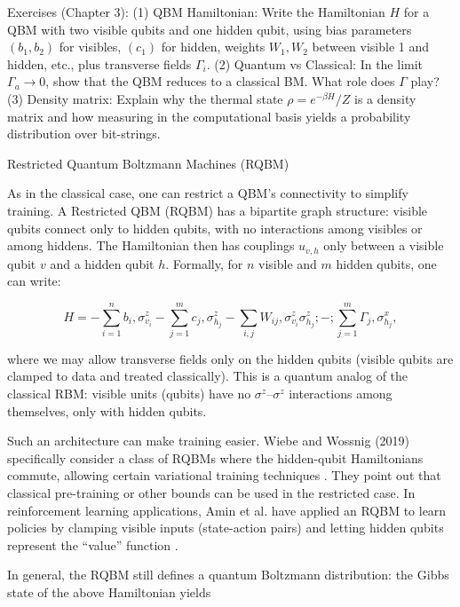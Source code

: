 Exercises (Chapter 3): (1) QBM Hamiltonian: Write the Hamiltonian $H$ for a QBM with two visible qubits and one hidden qubit, using bias parameters $(b_1,b_2)$ for visibles, $(c_1)$ for hidden, weights $W_{1},W_{2}$ between visible 1 and hidden, etc., plus transverse fields $\Gamma_i$. (2) Quantum vs Classical: In the limit $\Gamma_a\to 0$, show that the QBM reduces to a classical BM. What role does $\Gamma$ play? (3) Density matrix: Explain why the thermal state $\rho=e^{-\beta H}/Z$ is a density matrix and how measuring in the computational basis yields a probability distribution over bit-strings.





Restricted Quantum Boltzmann Machines (RQBM)





As in the classical case, one can restrict a QBM’s connectivity to simplify training. A Restricted QBM (RQBM) has a bipartite graph structure: visible qubits connect only to hidden qubits, with no interactions among visibles or among hiddens.  The Hamiltonian then has couplings $u_{v,h}$ only between a visible qubit $v$ and a hidden qubit $h$.  Formally, for $n$ visible and $m$ hidden qubits, one can write:

$$

H = -\sum_{i=1}^n b_i,\sigma^z_{v_i} - \sum_{j=1}^m c_j,\sigma^z_{h_j} - \sum_{i,j} W_{ij},\sigma^z_{v_i}\sigma^z_{h_j} ;-; \sum_{j=1}^m \Gamma_j,\sigma^x_{h_j},

$$

where we may allow transverse fields only on the hidden qubits (visible qubits are clamped to data and treated classically). This is a quantum analog of the classical RBM: visible units (qubits) have no $\sigma^z$–$\sigma^z$ interactions among themselves, only with hidden qubits.



Such an architecture can make training easier.  Wiebe and Wossnig (2019) specifically consider a class of RQBMs where the hidden-qubit Hamiltonians commute, allowing certain variational training techniques . They point out that classical pre-training or other bounds can be used in the restricted case.  In reinforcement learning applications, Amin et al. have applied an RQBM to learn policies by clamping visible inputs (state-action pairs) and letting hidden qubits represent the “value” function .



In general, the RQBM still defines a quantum Boltzmann distribution: the Gibbs state of the above Hamiltonian yields

